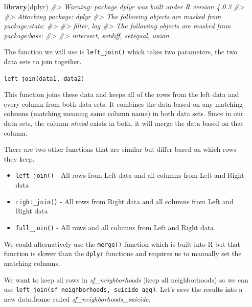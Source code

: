 \documentclass[
  12pt,
]{book}
\newenvironment{Shaded}{\begin{snugshade}}{\end{snugshade}}
\newcommand{\CommentTok}[1]{\textcolor[rgb]{0.37,0.37,0.37}{\textit{#1}}}
\newcommand{\KeywordTok}[1]{\textcolor[rgb]{0.27,0.27,0.27}{\textbf{#1}}}
\newcommand{\NormalTok}[1]{#1}
\providecommand{\tightlist}{%
  \setlength{\itemsep}{0pt}\setlength{\parskip}{0pt}}
\begin{document}
\begin{Shaded}
\begin{Highlighting}[]
\KeywordTok{library}\NormalTok{(dplyr)}
\CommentTok{\#\textgreater{} Warning: package \textquotesingle{}dplyr\textquotesingle{} was built under R version 4.0.3}
\CommentTok{\#\textgreater{} }
\CommentTok{\#\textgreater{} Attaching package: \textquotesingle{}dplyr\textquotesingle{}}
\CommentTok{\#\textgreater{} The following objects are masked from \textquotesingle{}package:stats\textquotesingle{}:}
\CommentTok{\#\textgreater{} }
\CommentTok{\#\textgreater{}     filter, lag}
\CommentTok{\#\textgreater{} The following objects are masked from \textquotesingle{}package:base\textquotesingle{}:}
\CommentTok{\#\textgreater{} }
\CommentTok{\#\textgreater{}     intersect, setdiff, setequal, union}
\end{Highlighting}
\end{Shaded}

The function we will use is \texttt{left\_join()} which takes two parameters, the two data sets to join together.

\texttt{left\_join(data1,\ data2)}

This function joins these data and keeps all of the rows from the left data and every column from both data sets. It combines the data based on any matching columns (matching meaning same column name) in both data sets. Since in our data sets, the column \emph{nhood} exists in both, it will merge the data based on that column.

There are two other functions that are similar but differ based on which rows they keep.

\begin{itemize}
\tightlist
\item
  \texttt{left\_join()} - All rows from Left data and all columns from Left and Right data
\item
  \texttt{right\_join()} - All rows from Right data and all columns from Left and Right data
\item
  \texttt{full\_join()} - All rows and all columns from Left and Right data
\end{itemize}

We could alternatively use the \texttt{merge()} function which is built into R but that function is slower than the \texttt{dplyr} functions and requires us to manually set the matching columns.

We want to keep all rows in \emph{sf\_neighborhoods} (keep all neighborhoods) so we can use \texttt{left\_join(sf\_neighborhoods,\ suicide\_agg)}. Let's save the results into a new data.frame called \emph{sf\_neighborhoods\_suicide}.
\end{document}
